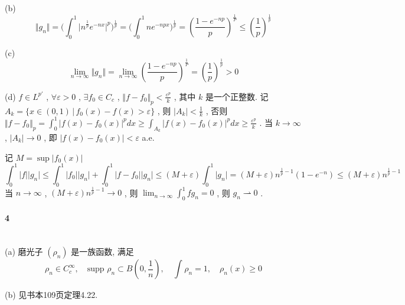 \documentclass[a4paper, UTF8]{ctexart}				%
\numberwithin{equation}{section}				%
\begin{document}
			\indent (b) 
			\[
				\Vert{g_n}\Vert = \Big( \int^{1}_{0} \vert{n^{\frac{1}{p}}e^{-nx}}\vert^p \Big)^{\frac{1}{p}} = \Big( \int^{1}_{0} n e^{-npx} \Big)^{\frac{1}{p}} = (\frac{1 - e^{-np}}{p})^{\frac{1}{P}} \le (\frac{1}{p})^{\frac{1}{p}}
			\]

			\indent (c) 
			\[
				\lim_{n \rightarrow \infty} \Vert{g_n}\Vert = \lim_{n \rightarrow \infty} (\frac{1 - e^{-np}}{p})^{\frac{1}{P}} = (\frac{1}{p})^{\frac{1}{p}} > 0
			\]

			\indent (d) $f \in L^{p'}$ , $\forall \varepsilon > 0$ , $\exists f_0 \in C_c$ , $\Vert{f - f_0}\Vert_p < \frac{\varepsilon^p}{k}$ , 其中 $k$ 是一个正整数. 记 $A_k = \{x \in (0, 1) \, | \, f_0(x) - f(x) > \varepsilon\}$ , 则 $\vert{A_k}\vert < \frac{1}{k}$ , 否则 $\Vert{f - f_0}\Vert_p = \int^{1}_{0} \vert{f(x) - f_0(x)}\vert^p dx \ge \int^{ }_{A_k} \vert{f(x) - f_0(x)}\vert^p dx \ge \frac{\varepsilon^p}{k}$ . 当 $k \rightarrow \infty$ , $\vert{A_k}\vert \rightarrow 0$ , 即 $\vert{f(x) - f_0(x)}\vert < \varepsilon$ a.e. 
			
			记 $M = \sup \vert{f_0(x)}\vert$ 
			\[
				\int^{1}_{0} \vert{f}\vert \vert{g_n}\vert \le \int^{1}_{0} \vert{f_0}\vert \vert{g_n}\vert + \int^{1}_{0} \vert{f - f_0}\vert \vert{g_n}\vert \le (M + \varepsilon)\int^{1}_{0} \vert{g_n}\vert = (M + \varepsilon) n^{\frac{1}{p} - 1} (1 - e^{-n}) \le (M + \varepsilon) n^{\frac{1}{p} - 1}
			\]
			当 $n \rightarrow \infty$ , $(M + \varepsilon) n^{\frac{1}{p} - 1} \rightarrow 0$ , 则 $\lim_{n \rightarrow  \infty} \int^{1}_{0} fg_n = 0$ , 则 $g_n \rightharpoonup 0$ .\\

		\paragraph{4}\quad\\
			\indent (a) 磨光子 $(\rho_n)$ 是一族函数, 满足 
			\[
				\rho_n \in C_c^\infty, \quad \text{supp } \rho_n \subset B(0, \frac{1}{n}), \quad \int^{ }_{ } \rho_n = 1, \quad \rho_n(x) \ge 0
			\]

			\indent (b) 见书本109页定理4.22.\\
\end{document}

